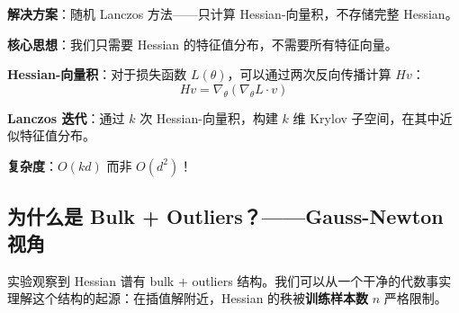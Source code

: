 \documentclass[12pt, a4paper]{ctexart}
\begin{document}
\textbf{解决方案}：随机 Lanczos 方法——只计算 Hessian-向量积，不存储完整 Hessian。

\begin{blackboard}

\textbf{核心思想}：我们只需要 Hessian 的特征值分布，不需要所有特征向量。

\textbf{Hessian-向量积}：对于损失函数 $L(\theta)$，可以通过两次反向传播计算 $Hv$：
\[
Hv = \nabla_\theta (\nabla_\theta L \cdot v)
\]

\textbf{Lanczos 迭代}：通过 $k$ 次 Hessian-向量积，构建 $k$ 维 Krylov 子空间，在其中近似特征值分布。

\textbf{复杂度}：$O(kd)$ 而非 $O(d^2)$！

\end{blackboard}

\subsection{为什么是 Bulk + Outliers？——Gauss-Newton 视角}

实验观察到 Hessian 谱有 bulk + outliers 结构。我们可以从一个干净的代数事实理解这个结构的起源：在插值解附近，Hessian 的秩被\textbf{训练样本数} $n$ 严格限制。
\end{document}
